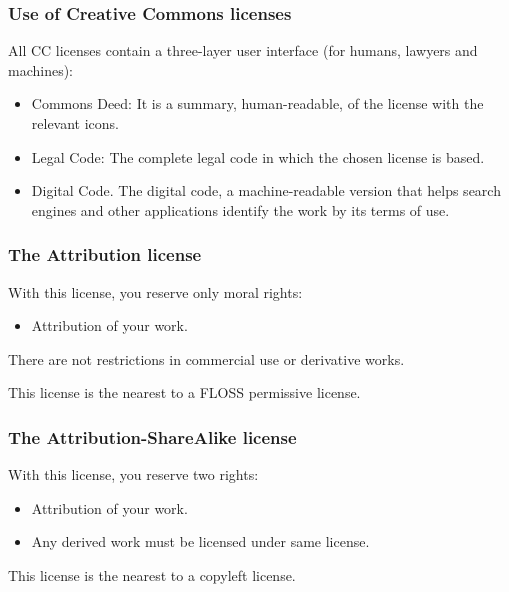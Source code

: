 \begin{frame}
\frametitle{Use of Creative Commons licenses}

All CC licenses contain a \alert{three-layer user interface} (for humans, lawyers and machines):
\begin{itemize}
\item \alert{Commons Deed:} It is a summary, human-readable, of the license with the relevant icons.
\item \alert{Legal Code:} The complete legal code in which the chosen license is based.
\item \alert{Digital Code.} The digital code, a machine-readable version that helps search engines and other applications identify the work by its terms of use.
\end{itemize}                                                 

\end{frame}


\begin{frame}
\frametitle{The Attribution license}

With this license, you reserve only moral rights:

\begin{itemize}
\item Attribution of your work.
\end{itemize}

There are not restrictions in commercial use or derivative works.

This license is the nearest to a FLOSS permissive license. 

\end{frame}



\begin{frame}
\frametitle{The Attribution-ShareAlike license}

With this license, you reserve two rights:

\begin{itemize}
\item Attribution of your work.
\item Any derived work must be licensed under same license.
\end{itemize}

This license is the nearest to a copyleft license. 

\end{frame}

